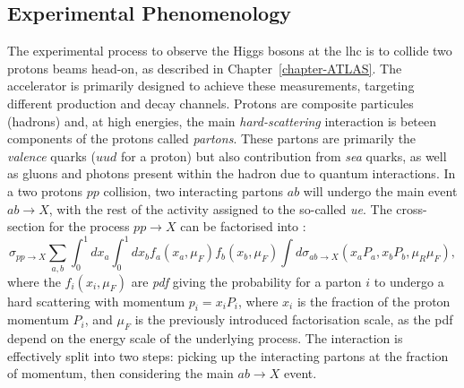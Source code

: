 \subsection{Experimental Phenomenology}
The experimental process to observe the Higgs bosons at the \gls{lhc} is to collide two protons beams head-on, as described in Chapter~\ref{chapter-ATLAS}. The accelerator is primarily designed to achieve these measurements, targeting different production and decay channels. Protons are composite particules (hadrons) and, at high energies, the main \textit{hard-scattering} interaction is beteen components of the protons called \textit{partons}. These partons are primarily the \textit{valence} quarks ($uud$ for a proton) but also contribution from \textit{sea} quarks, as well as gluons and photons present within the hadron due to quantum interactions. In a two protons $pp$ collision, two interacting partons $ab$ will undergo the main event $ab \rightarrow X$, with the rest of the activity assigned to the so-called \textit{\gls{ue}}. The cross-section for the process $pp \rightarrow X$ can be factorised into \cite{collins2004factorization}: 
\begin{equation}
\sigma_{pp\rightarrow X} \sum_{a,b} \int_0^1 dx_a \int_0^1 dx_b f_a(x_a, \mu_F) f_b(x_b, \mu_F) \int d\sigma_{ab\rightarrow X}\left(x_aP_a, x_bP_b, \mu_R \mu_F \right),
\end{equation}
where the $f_i(x_i, \mu_F)$ are \textit{\gls{pdf}} giving the probability for a parton $i$ to undergo a hard scattering with momentum $p_i = x_i P_i$, where $x_i$ is the fraction of the proton momentum $P_i$, and $\mu_F$ is the previously introduced factorisation scale, as the \gls{pdf} depend on the energy scale of the underlying process. The interaction is effectively split into two steps: picking up the interacting partons at the fraction of momentum, then considering the main $ab \rightarrow X$ event.\\

